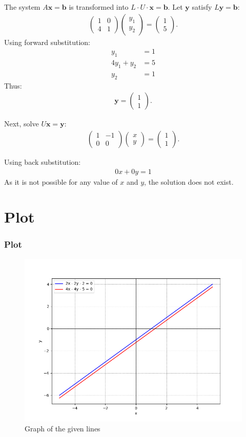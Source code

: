 \documentclass{beamer}
\theoremstyle{remark}
\newcommand{\myvec}[1]{\ensuremath{\begin{pmatrix}#1\end{pmatrix}}}
\let\vec\mathbf
\numberwithin{equation}{section}
\begin{document}
\begin{frame}
The system $A\vec{x} = \vec{b}$ is transformed into $L \cdot U \cdot \vec{x} = \vec{b}$. Let $\vec{y}$ satisfy $L\vec{y} = \vec{b}$:
\begin{align}
    \myvec{1 & 0 \\ 4 & 1} \myvec{y_1 \\ y_2} = \myvec{1 \\ 5}.
\end{align}
Using forward substitution:
\begin{align}
    y_1 &= 1 \\
    4y_1 + y_2 &= 5\\
    y_2 &= 1
\end{align}
Thus:
\begin{align}
    \vec{y} = \myvec{1 \\ 1}.
\end{align}
\end{frame}
\begin{frame}
Next, solve $U\vec{x} = \vec{y}$:
\begin{align}
    \myvec{1 & -1 \\ 0 & 0} \myvec{x \\ y} = \myvec{1 \\ 1}.
\end{align}

Using back substitution:
\begin{align}
	0x+0y = 1
\end{align}
As it is not possible for any value of $x$ and $y$, the solution does not exist.
\end{frame}
\section{Plot}
\begin{frame}
\frametitle{Plot}
\begin{figure}[h!]
   \centering
   \includegraphics[width=0.8\columnwidth]{figs/fig.png}
   \caption{Graph of the given lines}
   \label{stemplot}
\end{figure}
\end{frame}
\end{document}
